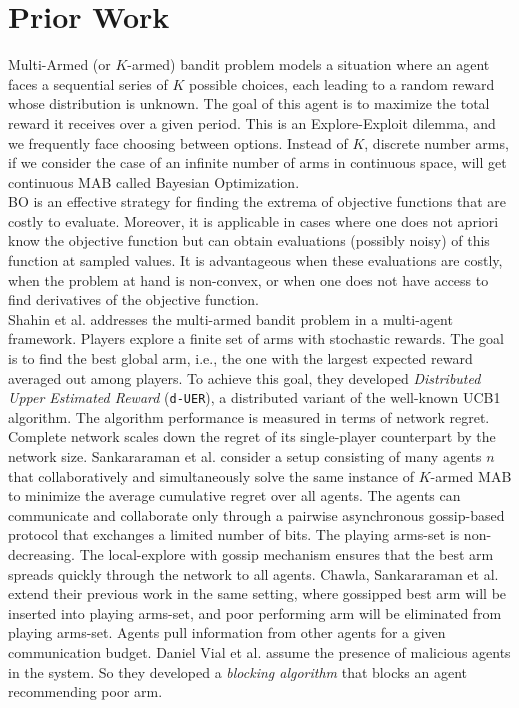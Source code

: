\section{Prior Work}
\label{sec:prior-work}
Multi-Armed (or $K$-armed) bandit problem models a situation where an agent faces a sequential series of $K$ possible choices, each leading to a random reward whose distribution is unknown. 
The goal of this agent is to maximize the total reward it receives over a given period. 
This is an Explore-Exploit dilemma, and we frequently face choosing between options. 
Instead of $K$, discrete number arms, if we consider the case of an infinite number of arms in continuous space, will get continuous MAB called Bayesian Optimization.\cite{Srinivas-Bandits}\\

BO is an effective strategy for finding the extrema of objective functions that are costly to evaluate. 
Moreover, it is applicable in cases where one does not apriori know the objective function but can obtain evaluations (possibly noisy) of this function at sampled values. 
It is advantageous when these evaluations are costly, when the problem at hand is non-convex, or when one does not have access to find derivatives of the objective function.\cite{Freitas-BO}\\

Shahin et al.\cite{Shahrampour} addresses the multi-armed bandit problem in a multi-agent framework. 
Players explore a finite set of arms with stochastic rewards. 
The goal is to find the best global arm, i.e., the one with the largest expected reward averaged out among players. 
To achieve this goal, they developed \textit{Distributed Upper Estimated Reward} (\texttt{d-UER}), a distributed variant of the well-known UCB1 algorithm. 
The algorithm performance is measured in terms of network regret. Complete network scales down the regret of its single-player counterpart by the network size.
Sankararaman et al.\cite{Sankararaman.ma.mab} consider a setup consisting of many agents $n$ that collaboratively and simultaneously solve the same instance of $K$-armed MAB to minimize the average cumulative regret over all agents. 
The agents can communicate and collaborate only through a pairwise asynchronous gossip-based protocol that exchanges a limited number of bits. The playing arms-set is non-decreasing. 
The local-explore with gossip mechanism ensures that the best arm spreads quickly through the network to all agents.
Chawla, Sankararaman et al.\cite{chawla2020gossiping} extend their previous work in the same setting, where gossipped best arm will be inserted into playing arms-set, and poor performing arm will be eliminated from playing arms-set. 
Agents pull information from other agents for a given communication budget.
Daniel Vial et al.\cite{Daniel.robust.ma.mab} assume the presence of malicious agents in the system. So they developed a \textit{blocking algorithm} that blocks an agent recommending poor arm.\\

